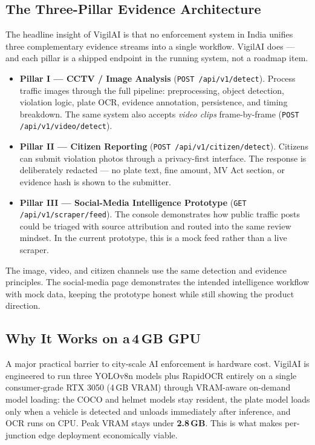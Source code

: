 \documentclass[11pt,a4paper]{article}
\begin{document}
\subsection{The Three-Pillar Evidence Architecture}

The headline insight of VigilAI is that no enforcement system in India unifies three complementary evidence streams into a single workflow. VigilAI does — and each pillar is a shipped endpoint in the running system, not a roadmap item.

\begin{itemize}
  \item \textbf{Pillar I — CCTV / Image Analysis} (\texttt{POST /api/v1/detect}). Process traffic images through the full pipeline: preprocessing, object detection, violation logic, plate OCR, evidence annotation, persistence, and timing breakdown. The same system also accepts \emph{video clips} frame-by-frame (\texttt{POST /api/v1/video/detect}).
  \item \textbf{Pillar II — Citizen Reporting} (\texttt{POST /api/v1/citizen/detect}). Citizens can submit violation photos through a privacy-first interface. The response is deliberately redacted — no plate text, fine amount, MV Act section, or evidence hash is shown to the submitter.
  \item \textbf{Pillar III — Social-Media Intelligence Prototype} (\texttt{GET /api/v1/scraper/feed}). The console demonstrates how public traffic posts could be triaged with source attribution and routed into the same review mindset. In the current prototype, this is a mock feed rather than a live scraper.
\end{itemize}

The image, video, and citizen channels use the same detection and evidence principles. The social-media page demonstrates the intended intelligence workflow with mock data, keeping the prototype honest while still showing the product direction.

\subsection{Why It Works on a\texorpdfstring{\,}{ }4\texorpdfstring{\,}{ }GB GPU}

A major practical barrier to city-scale AI enforcement is hardware cost. VigilAI is engineered to run three YOLOv8n models plus RapidOCR entirely on a single consumer-grade RTX 3050 (4\,GB VRAM) through VRAM-aware on-demand model loading: the COCO and helmet models stay resident, the plate model loads only when a vehicle is detected and unloads immediately after inference, and OCR runs on CPU. Peak VRAM stays under \textbf{2.8\,GB}. This is what makes per-junction edge deployment economically viable.
\end{document}
